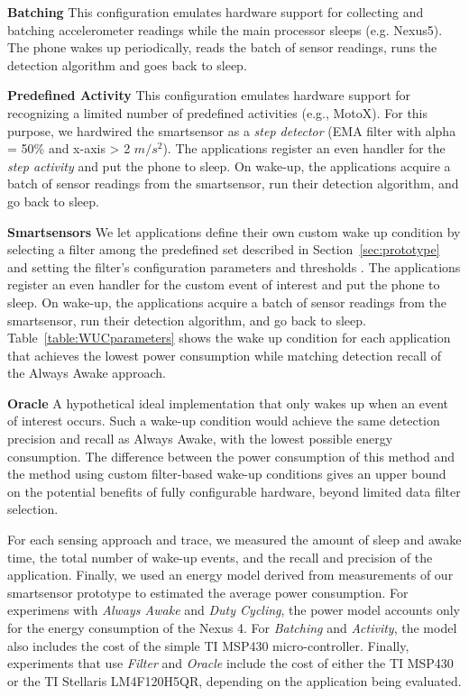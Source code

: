\textbf{Batching} This configuration emulates hardware support for
collecting and batching accelerometer readings while the main
processor sleeps (e.g. Nexus5).  The phone wakes up periodically,
reads the batch of sensor readings, runs the detection algorithm and
goes back to sleep.

\textbf{Predefined Activity} This configuration emulates hardware
support for recognizing a limited number of predefined activities
(e.g., MotoX).  For this purpose, we hardwired the smartsensor as a
{\em step detector} (EMA filter with alpha = 50\% and x-axis
> 2 $m/s^2$).  The applications register an even handler for the {\em
  step activity} and put the phone to sleep.  On wake-up, the
applications acquire a batch of sensor readings from the smartsensor,
run their detection algorithm, and go back to sleep.

\textbf{Smartsensors} We let applications define their own custom wake
up condition by selecting a filter among the predefined set described
in Section~\ref{sec:prototype} and setting the filter's configuration
parameters and thresholds .  The applications register an even handler
for the custom event of interest and put the phone to sleep.  On
wake-up, the applications acquire a batch of sensor readings from the
smartsensor, run their detection algorithm, and go back to sleep.
Table~\ref{table:WUCparameters} shows the wake up condition for each
application that achieves the lowest power consumption while matching
detection recall of the Always Awake approach.

\textbf{Oracle} A hypothetical ideal implementation that only wakes up
when an event of interest occurs.  Such a wake-up condition would
achieve the same detection precision and recall as Always Awake, with
the lowest possible energy consumption. The difference between the
power consumption of this method and the method using custom
filter-based wake-up conditions gives an upper bound on the potential
benefits of fully configurable hardware, beyond limited data filter
selection.

For each sensing approach and trace, we measured the amount of sleep
and awake time, the total number of wake-up events, and the recall and
precision of the application.  Finally, we used an energy model
derived from measurements of our smartsensor prototype to estimated
the average power consumption.  For experimens with {\em Always Awake}
and {\em Duty Cycling}, the power model accounts only for the energy
consumption of the Nexus 4.  For {\em Batching} and {\em Activity},
the model also includes the cost of the simple TI MSP430
micro-controller.  Finally, experiments that use {\em Filter} and {\em
  Oracle} include the cost of either the TI MSP430 or the TI Stellaris
LM4F120H5QR, depending on the application being evaluated.








